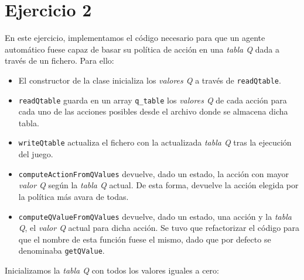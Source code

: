 \documentclass[12pt]{article}
\begin{document}


\newpage
\section{Ejercicio 2}

En este ejercicio, implementamos el código necesario para que un agente automático fuese capaz de basar su política de acción en una \textit{tabla Q} dada a través de un fichero. Para ello:

\begin{itemize}
    \item El constructor de la clase inicializa los \textit{valores Q} a través de \texttt{readQtable}.
    \item \texttt{readQtable} guarda en un array \texttt{q\_table} los \textit{valores Q} de cada acción para cada uno de las acciones posibles desde el archivo donde se almacena dicha tabla.
    \item \texttt{writeQtable} actualiza el fichero con la actualizada \textit{tabla Q} tras la ejecución del juego.
    \item \texttt{computeActionFromQValues} devuelve, dado un estado, la acción con mayor \textit{valor Q} según la \textit{tabla Q} actual. De esta forma, devuelve la acción elegida por la política más avara de todas.
    \item \texttt{computeQValueFromQValues} devuelve, dado un estado, una acción y la \textit{tabla Q}, el \textit{valor Q} actual para dicha acción. Se tuvo que refactorizar el código para que el nombre de esta función fuese el mismo, dado que por defecto se denominaba \texttt{getQValue}.
\end{itemize}

Inicializamos la \textit{tabla Q} con todos los valores iguales a cero: \\
\end{document}
